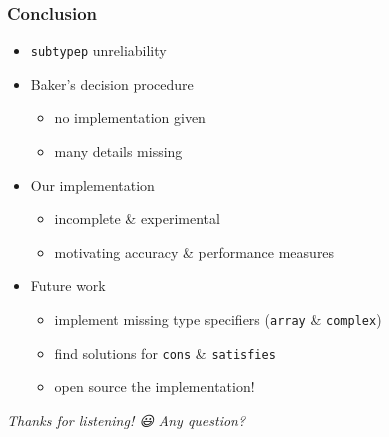 \documentclass[aspectratio=169]{beamer}
\renewcommand\code[1]{\texttt{#1}}
\newcommand\emoji[2][\tiny]{{#1#2}}
\begin{document}
\begin{frame}[standout]
  \frametitle{Conclusion}
  \begin{itemize}
  \item \code{subtypep} unreliability
  \item Baker's decision procedure
    \begin{itemize}
    \item no implementation given
    \item many details missing
    \end{itemize}
  \item Our implementation
    \begin{itemize}
    \item incomplete \& experimental
    \item motivating accuracy \& performance measures
    \end{itemize}
  \item Future work
    \begin{itemize}
    \item implement missing type specifiers (\code{array} \& \code{complex})
    \item find solutions for \code{cons} \& \code{satisfies}
    \item open source the implementation!
    \end{itemize}
  \end{itemize}
\end{frame}

\begin{sectionframe}{\it Thanks for listening! \emoji[\normalsize]{😃}}
  \it Any question?
\end{sectionframe}

%   
%   
\end{document}

